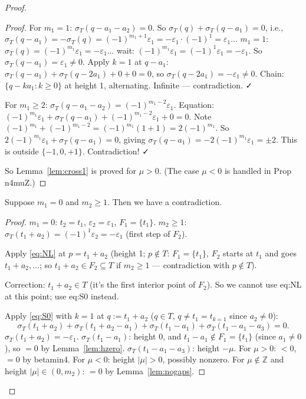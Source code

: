 \begin{proof}
\begin{proof}
For $m_1=1$: $\sigma_T(q-a_1-a_2)=0$. So $\sigma_T(q)+\sigma_T(q-a_1)=0$, i.e., $\sigma_T(q-a_1)=-\sigma_T(q)=(-1)^{m_1+1}\varepsilon_1 = -\varepsilon_1 \cdot (-1)^1 = \varepsilon_1$... $m_1=1$: $\sigma_T(q)=(-1)^{m_1}\varepsilon_1=-\varepsilon_1$... wait: $(-1)^{m_1}\varepsilon_1 = (-1)^1\varepsilon_1=-\varepsilon_1$. So $\sigma_T(q-a_1)=\varepsilon_1 \neq 0$. Apply $k=1$ at $q-a_1$: $\sigma_T(q-a_1)+\sigma_T(q-2a_1)+0+0=0$, so $\sigma_T(q-2a_1)=-\varepsilon_1 \neq 0$. Chain: $\{q-ka_1:k\geq 0\}$ at height 1, alternating. Infinite — contradiction. ✓

For $m_1 \geq 2$: $\sigma_T(q-a_1-a_2)=(-1)^{m_1-2}\varepsilon_1$. Equation: $(-1)^{m_1}\varepsilon_1+\sigma_T(q-a_1)+(-1)^{m_1-2}\varepsilon_1+0=0$. Note $(-1)^{m_1}+(-1)^{m_1-2}=(-1)^{m_1}(1+1)=2(-1)^{m_1}$. So $2(-1)^{m_1}\varepsilon_1+\sigma_T(q-a_1)=0$, giving $\sigma_T(q-a_1)=-2(-1)^{m_1}\varepsilon_1 = \pm 2$. This is outside $\{-1,0,+1\}$. Contradiction! ✓

So Lemma~\ref{lem:cross1} is proved for $\mu>0$. (The case $\mu<0$ is handled in Prop n4muZ.)
\end{proof}

\bigskip

\begin{lemma}[cross0: $m_1 = 0$, $m_2 \geq 1$]\label{lem:cross0}
Suppose $m_1 = 0$ and $m_2 \geq 1$. Then we have a contradiction.
\end{lemma}
\begin{proof}
$m_1=0$: $t_2=t_1$, $\varepsilon_2=\varepsilon_1$, $F_1=\{t_1\}$. $m_2 \geq 1$: $\sigma_T(t_1+a_2)=(-1)^1\varepsilon_2=-\varepsilon_1$ (first step of $F_2$).

Apply \eqref{eq:NL} at $p = t_1+a_2$ (height 1; $p \notin T$: $F_1=\{t_1\}$, $F_2$ starts at $t_1$ and goes $t_1+a_2,\ldots$; so $t_1+a_2 \in F_2 \subseteq T$ if $m_2 \geq 1$ — contradiction with $p \notin T$).

Correction: $t_1+a_2 \in T$ (it's the first interior point of $F_2$). So we cannot use eq:NL at this point; use eq:S0 instead.

Apply \eqref{eq:S0} with $k=1$ at $q:=t_1+a_2$ ($q \in T$, $q \neq t_1 = t_{k=1}$ since $a_2 \neq 0$):
\[
  \sigma_T(t_1+a_2)+\sigma_T(t_1+a_2-a_1)+\sigma_T(t_1-a_1)+\sigma_T(t_1-a_1-a_3)=0.
\]
$\sigma_T(t_1+a_2) = -\varepsilon_1$.
$\sigma_T(t_1-a_1)$: height 0, and $t_1-a_1 \notin F_1=\{t_1\}$ (since $a_1 \neq 0$), so $=0$ by Lemma~\ref{lem:hzero}.
$\sigma_T(t_1-a_1-a_3)$: height $-\mu$. For $\mu>0$: $<0$, $=0$ by betamin4. For $\mu<0$: height $|\mu|>0$, possibly nonzero. For $\mu \notin \mathbb{Z}$ and height $|\mu| \in (0,m_2)$: $=0$ by Lemma~\ref{lem:nogaps}.


\end{proof}
\end{proof}
